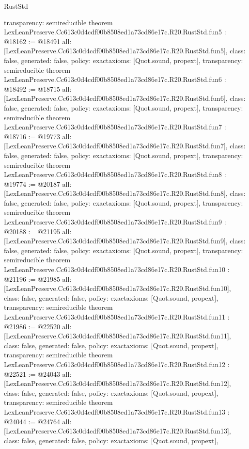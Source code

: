 \begin{lexlean}{RustStd}
\begin{coremodule}
{  transparency: semireducible
}
theorem LexLeanPreserve.Cc613c0d4cdf00b8508ed1a73cd86e17c.R20.RustStd.fun5 : @18162 := @18491 {
  all: [LexLeanPreserve.Cc613c0d4cdf00b8508ed1a73cd86e17c.R20.RustStd.fun5],
  class: false,
  generated: false,
  policy: exact{axioms: [Quot.sound, propext]},
  transparency: semireducible
}
theorem LexLeanPreserve.Cc613c0d4cdf00b8508ed1a73cd86e17c.R20.RustStd.fun6 : @18492 := @18715 {
  all: [LexLeanPreserve.Cc613c0d4cdf00b8508ed1a73cd86e17c.R20.RustStd.fun6],
  class: false,
  generated: false,
  policy: exact{axioms: [Quot.sound, propext]},
  transparency: semireducible
}
theorem LexLeanPreserve.Cc613c0d4cdf00b8508ed1a73cd86e17c.R20.RustStd.fun7 : @18716 := @19773 {
  all: [LexLeanPreserve.Cc613c0d4cdf00b8508ed1a73cd86e17c.R20.RustStd.fun7],
  class: false,
  generated: false,
  policy: exact{axioms: [Quot.sound, propext]},
  transparency: semireducible
}
theorem LexLeanPreserve.Cc613c0d4cdf00b8508ed1a73cd86e17c.R20.RustStd.fun8 : @19774 := @20187 {
  all: [LexLeanPreserve.Cc613c0d4cdf00b8508ed1a73cd86e17c.R20.RustStd.fun8],
  class: false,
  generated: false,
  policy: exact{axioms: [Quot.sound, propext]},
  transparency: semireducible
}
theorem LexLeanPreserve.Cc613c0d4cdf00b8508ed1a73cd86e17c.R20.RustStd.fun9 : @20188 := @21195 {
  all: [LexLeanPreserve.Cc613c0d4cdf00b8508ed1a73cd86e17c.R20.RustStd.fun9],
  class: false,
  generated: false,
  policy: exact{axioms: [Quot.sound, propext]},
  transparency: semireducible
}
theorem LexLeanPreserve.Cc613c0d4cdf00b8508ed1a73cd86e17c.R20.RustStd.fun10 : @21196 := @21985 {
  all: [LexLeanPreserve.Cc613c0d4cdf00b8508ed1a73cd86e17c.R20.RustStd.fun10],
  class: false,
  generated: false,
  policy: exact{axioms: [Quot.sound, propext]},
  transparency: semireducible
}
theorem LexLeanPreserve.Cc613c0d4cdf00b8508ed1a73cd86e17c.R20.RustStd.fun11 : @21986 := @22520 {
  all: [LexLeanPreserve.Cc613c0d4cdf00b8508ed1a73cd86e17c.R20.RustStd.fun11],
  class: false,
  generated: false,
  policy: exact{axioms: [Quot.sound, propext]},
  transparency: semireducible
}
theorem LexLeanPreserve.Cc613c0d4cdf00b8508ed1a73cd86e17c.R20.RustStd.fun12 : @22521 := @24043 {
  all: [LexLeanPreserve.Cc613c0d4cdf00b8508ed1a73cd86e17c.R20.RustStd.fun12],
  class: false,
  generated: false,
  policy: exact{axioms: [Quot.sound, propext]},
  transparency: semireducible
}
theorem LexLeanPreserve.Cc613c0d4cdf00b8508ed1a73cd86e17c.R20.RustStd.fun13 : @24044 := @24764 {
  all: [LexLeanPreserve.Cc613c0d4cdf00b8508ed1a73cd86e17c.R20.RustStd.fun13],
  class: false,
  generated: false,
  policy: exact{axioms: [Quot.sound, propext]},
}
\end{coremodule}
\end{lexlean}
